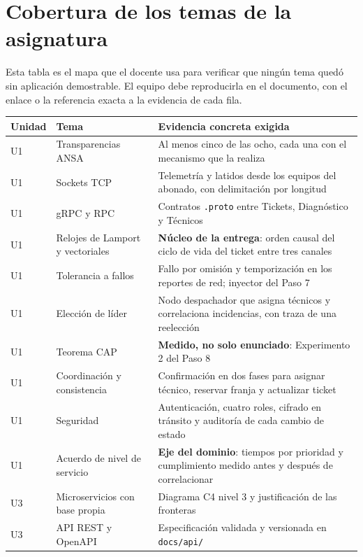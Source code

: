 \documentclass[11pt,a4paper]{article}
\begin{document}
	\section{Cobertura de los temas de la asignatura}
	
	Esta tabla es el mapa que el docente usa para verificar que ningún tema quedó sin aplicación demostrable. El equipo debe reproducirla en el documento, con el enlace o la referencia exacta a la evidencia de cada fila.
	
	\begin{center}
		\footnotesize
		\begin{longtable}{@{}p{1.1cm}p{4.9cm}p{8.9cm}@{}}
			\toprule
			\textbf{Unidad} & \textbf{Tema} & \textbf{Evidencia concreta exigida} \\
			\midrule
			\endhead
			U1 & Transparencias ANSA & Al menos cinco de las ocho, cada una con el mecanismo que la realiza \\
			U1 & Sockets TCP & Telemetría y latidos desde los equipos del abonado, con delimitación por longitud \\
			U1 & gRPC y RPC & Contratos \texttt{.proto} entre Tickets, Diagnóstico y Técnicos \\
			U1 & Relojes de Lamport y vectoriales & \textbf{Núcleo de la entrega}: orden causal del ciclo de vida del ticket entre tres canales \\
			U1 & Tolerancia a fallos & Fallo por omisión y temporización en los reportes de red; inyector del Paso 7 \\
			U1 & Elección de líder & Nodo despachador que asigna técnicos y correlaciona incidencias, con traza de una reelección \\
			U1 & Teorema CAP & \textbf{Medido, no solo enunciado}: Experimento 2 del Paso 8 \\
			U1 & Coordinación y consistencia & Confirmación en dos fases para asignar técnico, reservar franja y actualizar ticket \\
			U1 & Seguridad & Autenticación, cuatro roles, cifrado en tránsito y auditoría de cada cambio de estado \\
			U1 & Acuerdo de nivel de servicio & \textbf{Eje del dominio}: tiempos por prioridad y cumplimiento medido antes y después de correlacionar \\
			U3 & Microservicios con base propia & Diagrama C4 nivel 3 y justificación de las fronteras \\
			U3 & API REST y OpenAPI & Especificación validada y versionada en \texttt{docs/api/} \\

\end{longtable}
\end{center}
\end{document}
